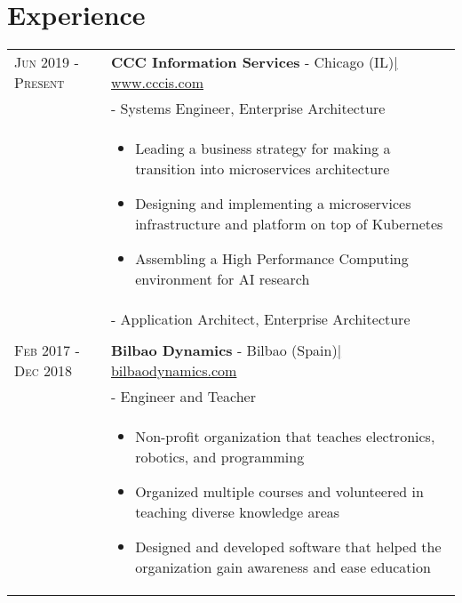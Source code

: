 \documentclass[a4paper,10pt]{article}
\begin{document}
\section{Experience}
\begin{tabular}{p{3.2cm}p{13.1cm}}

 \textsc{Jun 2019 - Present}& \textbf{CCC Information Services} - Chicago (IL)\href{https://www.cccis.com}{\hfill | \footnotesize www.cccis.com}\\
 & - Systems Engineer, Enterprise Architecture\\ 
 & \footnotesize{ \begin{itemize}[noitemsep,topsep=3pt]
 \vspace{-0.1in}
 \item Leading a business strategy for making a transition into microservices architecture
 \item Designing and implementing a microservices infrastructure and platform on top of Kubernetes
 \item Assembling a High Performance Computing environment for AI research
 \end{itemize}} \vspace{-0.14in} \\ 
 & - Application Architect, Enterprise Architecture \\
 \vspace{+0.004in} \\


 \textsc{Feb 2017 - Dec 2018}& \textbf{Bilbao Dynamics} - Bilbao (Spain)\href{https://bilbaodynamics.com/}{\hfill | \footnotesize bilbaodynamics.com}\\
 & - Engineer and Teacher \\ 
 & \footnotesize{ \begin{itemize}[noitemsep,topsep=3pt]
 \vspace{-0.1in}
 \item Non-profit organization that teaches electronics, robotics, and programming
 \item Organized multiple courses and volunteered in teaching diverse knowledge areas
 \item Designed and developed software that helped the organization gain awareness and ease education


\end{itemize}}
\end{tabular}
\end{document}

